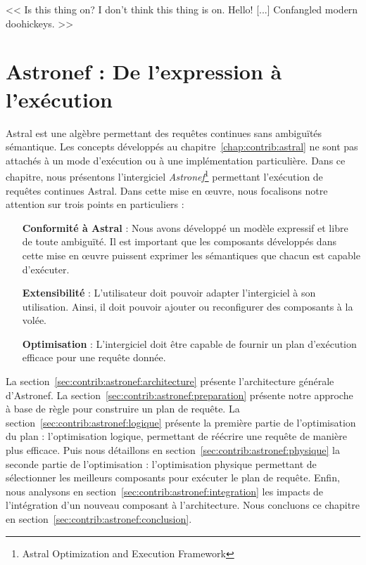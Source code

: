 \begin{savequote}[6cm]
<< Is this thing on? I don't think this thing is on. Hello! [...] Confangled modern doohickeys. >>
\end{savequote}

\chapter{Astronef : De l'expression à l'exécution}\label{chap:contrib:astronef}
\chaptertoc

Astral est une algèbre permettant des requêtes continues sans ambiguïtés sémantique. Les concepts développés au chapitre~\ref{chap:contrib:astral} ne sont pas attachés à un mode d'exécution ou à une implémentation particulière. Dans ce chapitre, nous présentons l'intergiciel \textit{Astronef}\footnote{Astral Optimization and Execution Framework} permettant l'exécution de requêtes continues Astral. Dans cette mise en œuvre, nous focalisons notre attention sur trois points en particuliers :
\begin{itemize}
	\item[\textbf{Conformité à Astral}] : Nous avons développé un modèle expressif et libre de toute ambiguïté. Il est important que les composants développés dans cette mise en œuvre puissent exprimer les sémantiques que chacun est capable d'exécuter.
	\item[\textbf{Extensibilité}] : L'utilisateur doit pouvoir adapter l'intergiciel à son utilisation. Ainsi, il doit pouvoir ajouter ou reconfigurer des composants à la volée.
	\item[\textbf{Optimisation}] : L'intergiciel doit être capable de fournir un plan d'exécution efficace pour une requête donnée.
\end{itemize}

La section~\ref{sec:contrib:astronef:architecture} présente l'architecture générale d'Astronef. La section~\ref{sec:contrib:astronef:preparation} présente notre approche à base de règle pour construire un plan de requête. La section~\ref{sec:contrib:astronef:logique} présente la première partie de l'optimisation du plan : l'optimisation logique, permettant de réécrire une requête de manière plus efficace. Puis nous détaillons en section~\ref{sec:contrib:astronef:physique} la seconde partie de l'optimisation : l'optimisation physique permettant de sélectionner les meilleurs composants pour exécuter le plan de requête. Enfin, nous analysons en section~\ref{sec:contrib:astronef:integration} les impacts de l'intégration d'un nouveau composant à l'architecture. Nous concluons ce chapitre en section~\ref{sec:contrib:astronef:conclusion}.

\lstset{language=PrologAstral}






